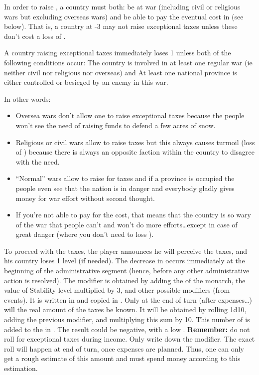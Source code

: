 \aparag[Condition] In order to raise , a country must
both:
\bparag be at war (including civil or religious wars but excluding overseas
wars) and
\bparag be able to pay the eventual cost in \STAB (see below). That is, a
country at -3 \STAB may not raise exceptional taxes unless these don't cost a
loss of \STAB.

 A country raising exceptional taxes immediately loses 1
\STAB unless both of the following conditions occur:
\bparag The country is involved in at least one regular war (ie neither civil
nor religious nor overseas) and
\bparag At least one national province is either controlled or besieged by an
enemy in this war.

\begin{designnote}
  In other words:
  \begin{itemize}
  \item Oversea wars don't allow one to raise exceptional taxes because the
    people won't see the need of raising funds to defend a few acres of snow.
  \item Religious or civil wars allow to raise taxes but this always causes
    turmoil (loss of \STAB) because there is always an opposite faction within
    the country to disagree with the need.
  \item ``Normal'' wars allow to raise for taxes and if a province is occupied
    the people even see that the nation is in danger and everybody gladly
    gives money for war effort without second thought.
  \item If you're not able to pay for the \STAB cost, that means that the
    country is so wary of the war that people can't and won't do more
    efforts\ldots except in case of great danger (where you don't need to loss
    \STAB).
  \end{itemize}
\end{designnote}

\aparag To proceed with the taxes, the player announces he will perceive the
taxes, and his country loses 1 \STAB level (if needed). The decrease in \STAB
occurs immediately at the beginning of the administrative segment (hence,
before any other administrative action is resolved).
\bparag The modifier is obtained by adding the \ADM of the monarch, the value
of Stability level multiplied by 3, and other possible modifiers (from
events). It is written in  and
copied in .
\bparag Only at the end of turn (after expenses\ldots) will the real amount of
the taxes be known. It will be obtained by rolling 1d10, adding the previous
modifier, and multiplying this sum by 10. This number of \Ducats is added to
the \RT in .
\bparag The result could be negative, with a low \STAB.
\bparag \textbf{Remember:} do not roll for exceptional taxes during
income. Only write down the modifier. The exact roll will happen at end of
turn, once expenses are planned. Thus, one can only get a rough estimate of
this amount and must spend money according to this estimation.

